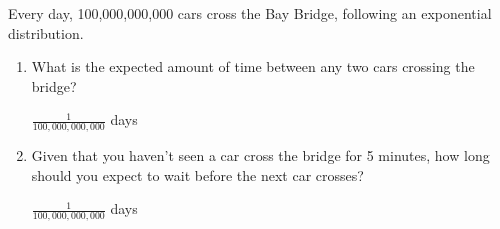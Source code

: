\question Every day, 100,000,000,000 cars cross the Bay Bridge, following an 
exponential distribution. 
\begin{enumerate}[label=(\alph*.)]
\item What is the expected amount of time between 
any two cars crossing the bridge?
\begin{solution}[0.5 cm]
$\frac{1}{100,000,000,000}$ days
\end{solution}

\item Given that you haven’t seen a car cross the bridge for 5 minutes, how 
long should you expect to wait before the next car crosses?
\begin{solution}[0.5cm]
$\frac{1}{100,000,000,000}$ days
\end{solution}  
\end{enumerate}